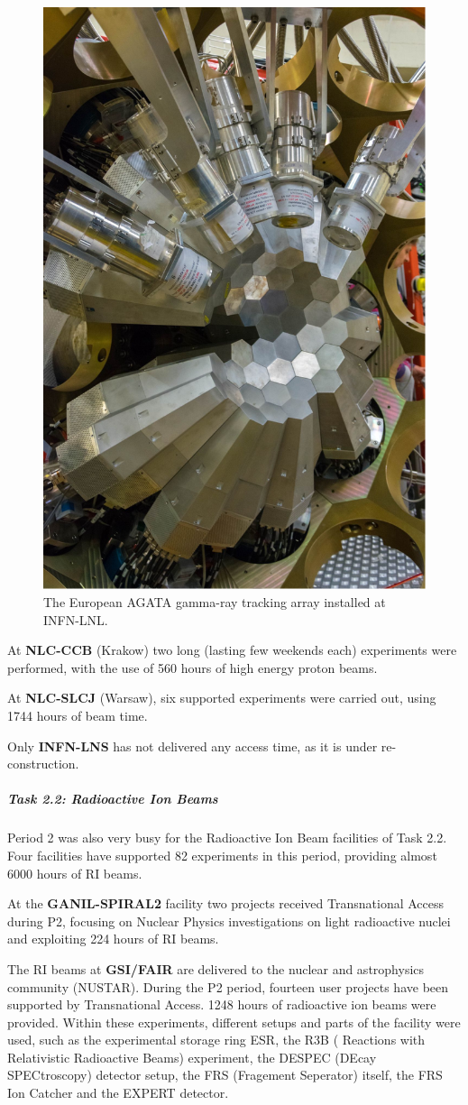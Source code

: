 \begin{figure}[!h]
    \centering
    \includegraphics[width=0.5\linewidth]{graphics/AGATA_LNL.png}
    \caption{The European AGATA gamma-ray tracking array installed at INFN-LNL.}
    \label{fig:AGATA_LNL}
\end{figure}

At \textbf{NLC-CCB} (Krakow) two long (lasting few weekends each) experiments were performed, with the use of 560 hours of high energy proton beams. 

At \textbf{NLC-SLCJ} (Warsaw), six supported experiments were carried out, using 1744 hours of beam time.

Only \textbf{INFN-LNS} has not delivered any access time, as it is under re-construction.

\subparagraph{Task 2.2: Radioactive Ion Beams} \mbox{}


Period 2 was also very busy for the Radioactive Ion Beam facilities of Task 2.2. Four facilities have supported 82 experiments in this period, providing almost 6000 hours of RI beams. 

At the \textbf{GANIL-SPIRAL2} facility two projects received Transnational Access during P2, focusing on Nuclear Physics investigations on light radioactive nuclei and exploiting 224 hours of RI beams.

The RI beams at \textbf{GSI/FAIR} are delivered to the nuclear and astrophysics community (NUSTAR). During the P2 period, fourteen user projects have been supported by Transnational Access. 1248 hours of radioactive ion beams were provided. Within these experiments, different setups and parts of the facility were used, such as the experimental storage ring ESR, the R3B ( Reactions with Relativistic Radioactive Beams) experiment, the DESPEC (DEcay SPECtroscopy) detector setup, the FRS (Fragement Seperator) itself, the FRS Ion Catcher and the EXPERT detector. 

